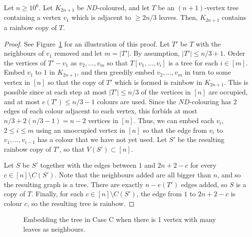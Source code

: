\begin{theorem}\label{Theorem_one_large_vertex}
Let $n\geq 10^6$. Let $K_{2n+1}$ be $ND$-coloured, and let $T$ be an $(n+1)$-vertex tree containing a vertex $v_1$ which is adjacent to $\geq 2n/3$ leaves.
Then, $K_{2n+1}$ contains a rainbow copy of $T$.
\end{theorem}
\begin{proof}
See Figure~\ref{Figure_1_vertex} for an illustration of this proof.
Let $T'$ be $T$ with the neighbours of $v_1$ removed and let $m=|T'|$. By assumption, $|T'|\leq n/3+1$. Order the vertices of $T'-v_1$ as $v_2, \dots, v_{m}$ so that $T[v_1, \dots, v_i]$ is a tree for each $i\in [m]$. Embed $v_1$ to $1$ in $K_{2n+1}$, and then greedily embed $v_2, \dots, v_m$ in turn to some vertex in $[n]$ so that the copy
of $T'$ which is formed is rainbow in $K_{2n+1}$. This is possible since at each step at most $|T'|\leq n/3$ of the vertices in $[n]$ are occupied, and at most $e(T')\leq n/3-1$ colours are used. Since the $ND$-colouring has 2 edges of each colour adjacent to each vertex,
this forbids at most $n/3+2(n/3-1)=n-2$ vertices in $[n]$. Thus, we can embed each $v_{i}$, $2\leq i\leq m$ using an unoccupied vertex in $[n]$ so that the edge from $v_i$ to $v_1, \ldots, v_{i-1}$ has a colour that we have not yet used. Let $S'$ be the resulting rainbow copy of $T'$, so that $V(S')\subset [n]$.

Let $S$ be $S'$ together with the edges between $1$ and $2n+2-c$ for every $c\in [n]\setminus C(S')$. Note that the neighbours added are all bigger than $n$, and so the resulting graph is a tree. There are exactly $n-e(T')$ edges added, so $S$ is a copy of $T$. Finally, for each $c\in [n]\setminus C(S')$, the edge from $1$ to $2n+2-c$ is colour $c$, so the resulting tree is rainbow.
\end{proof}

\begin{figure}[h]

\vspace{-0.1cm}

\begin{center}
{

}
\end{center}

\vspace{-0.1cm}

\caption{Embedding the tree in Case C when there is  1  vertex with many leaves as neighbours.}\label{Figure_1_vertex}
\end{figure}

